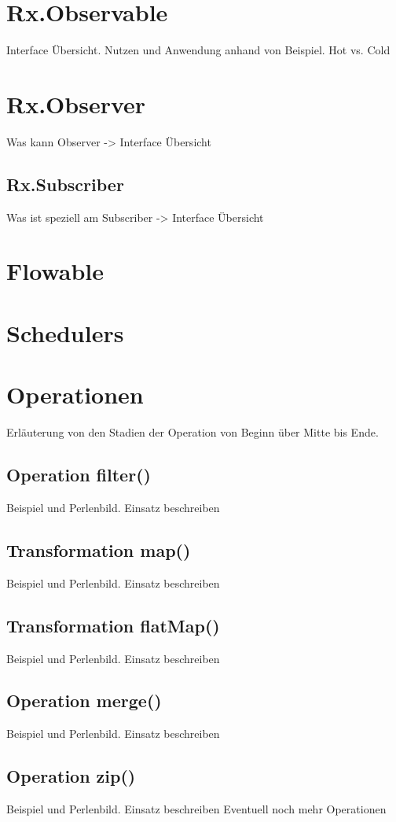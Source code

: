 \section{Rx.Observable}
Interface Übersicht. Nutzen und Anwendung anhand von Beispiel. Hot vs. Cold
\section{Rx.Observer}
Was kann Observer -> Interface Übersicht
\subsection{Rx.Subscriber}
Was ist speziell am Subscriber -> Interface Übersicht
\section{Flowable}
\section{Schedulers}
\section{Operationen}
Erläuterung von den Stadien der Operation von Beginn über Mitte bis Ende.
\subsection{Operation filter()}
Beispiel und Perlenbild. Einsatz beschreiben
\subsection{Transformation map()}
Beispiel und Perlenbild. Einsatz beschreiben
\subsection{Transformation flatMap()}
Beispiel und Perlenbild. Einsatz beschreiben
\subsection{Operation merge()}
Beispiel und Perlenbild. Einsatz beschreiben
\subsection{Operation zip()}
Beispiel und Perlenbild. Einsatz beschreiben
Eventuell noch mehr Operationen


